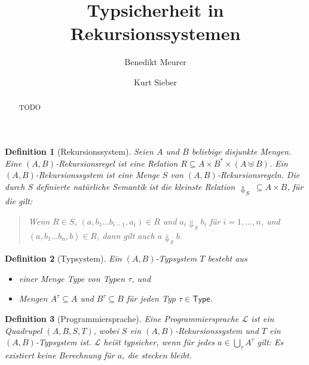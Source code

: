 \documentclass[12pt,a2paper,draft]{article}
\newtheorem{definition}{Definition}
\begin{document}
\title{%
  Typsicherheit in Rekursionssystemen
}
\author{Benedikt Meurer}
\author{Kurt Sieber}
\date{}
\maketitle
\begin{abstract}
  TODO
\end{abstract}


\begin{definition}[Rekursionssystem]
  Seien $A$ und $B$ beliebige disjunkte Mengen. Eine \emph{$(A,B)$-Rekursionsregel}
  ist eine Relation $R \subseteq A \times B^* \times (A \uplus B)$. Ein
  \emph{$(A,B)$-Rekursionssystem} ist eine Menge $S$
  von $(A,B)$-Rekursionsregeln.
  Die durch $S$ definierte \emph{nat\"urliche Semantik} ist die kleinste Relation
  $\Downarrow_S\ \subseteq A \times B$, f\"ur die gilt:
  \begin{quote}
    Wenn $R \in S$, $(a,b_1 \ldots b_{i-1},a_i) \in R$ und
    $a_i \Downarrow_S b_i$ f\"ur $i=1,\ldots,n$, und $(a,b_1 \ldots b_n,b) \in R$,
    dann gilt auch $a \Downarrow_S b$.
  \end{quote}
\end{definition}

\begin{definition}[Typsystem]
  Ein \emph{$(A,B)$-Typsystem} $T$ besteht aus
  \begin{itemize}
  \item einer Menge \textsf{Type} von Typen $\tau$, und
  \item Mengen $A^\tau \subseteq A$ und $B^\tau \subseteq B$ f\"ur jeden Typ $\tau \in \textsf{Type}$.
  \end{itemize}
\end{definition}

\begin{definition}[Programmiersprache]
  Eine \emph{Programmiersprache} $\mathcal{L}$ ist ein Quadrupel $(A,B,S,T)$, wobei $S$ ein
  $(A,B)$-Rekursionssystem und $T$ ein $(A,B)$-Typsystem ist. $\mathcal{L}$ hei\"st \emph{typsicher},
  wenn f\"ur jedes $a \in \bigcup_{\tau}A^\tau$ gilt: Es existiert keine Berechnung f\"ur $a$,
  die stecken bleibt.
\end{definition}
\end{document}
